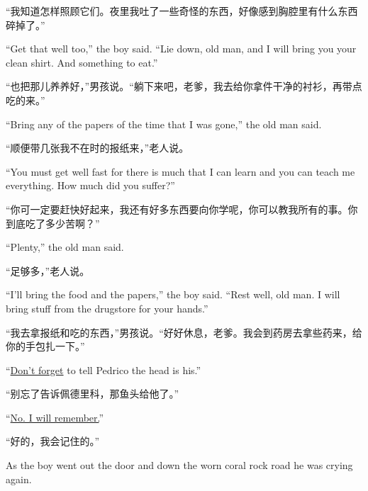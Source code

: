 \begin{paracol}{2}
\switchcolumn

“我知道怎样照顾它们。夜里我吐了一些奇怪的东西，好像感到胸腔里有什么东西碎掉了。”

\switchcolumn*

``Get that well too,'' the boy said. ``Lie down, old man, and I will bring
you your clean shirt. And something to eat.''

\switchcolumn

“也把那儿养养好，”男孩说。“躺下来吧，老爹，我去给你拿件干净的衬衫，再带点吃的来。”

\switchcolumn*

``Bring any of the papers of the time that I was gone,'' the old man said.

\switchcolumn

“顺便带几张我不在时的报纸来，”老人说。

\switchcolumn*

``You must get well fast for there is much that I can learn and you can
teach me everything. How much did you suffer?''

\switchcolumn

“你可一定要赶快好起来，我还有好多东西要向你学呢，你可以教我所有的事。你到底吃了多少苦啊？”

\switchcolumn*

``Plenty,'' the old man said.

\switchcolumn

“足够多，”老人说。

\switchcolumn*

``I'll bring the food and the papers,'' the boy said. ``Rest well, old man.
I will bring stuff from the \gls{drugstore} for your hands.''

\switchcolumn

“我去拿报纸和吃的东西，”男孩说。“好好休息，老爹。我会到药房去拿些药来，给你的手包扎一下。”

\switchcolumn*

``\uline{Don't forget} to tell Pedrico the head is his.''

\switchcolumn

“别忘了告诉佩德里科，那鱼头给他了。”

\switchcolumn*

``\uline{No. I will remember.}''

\switchcolumn

“好的，我会记住的。”

\switchcolumn*

As the boy went out the door and down the worn coral rock road he was
crying again.


\end{paracol}
